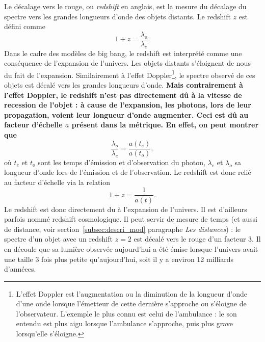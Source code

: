 \documentclass[11pt, twoside, a4paper, openright]{report}
\begin{document}
Le décalage vers le rouge, ou \emph{redshift} en anglais, est la mesure du décalage du spectre vers les grandes longueurs d'onde des objets distants. Le redshift $z$ est défini comme 
\begin{equation}
  \label{eq:redshift}
  1 + z = \frac{\lambda_o}{\lambda_e} .
\end{equation}
Dans le cadre des modèles de big bang, le redshift est interprété comme une conséquence de l'expansion de l'univers.
Les objets distants s'éloignent de nous du fait de l'expansion. Similairement à l'effet Doppler\footnote{L'effet Doppler est l'augmentation ou la diminution de la longueur d'onde d'une onde lorsque l'émetteur de cette dernière s'approche ou s'éloigne de l'observateur. L'exemple le plus connu est celui de l'ambulance : le son entendu est plus aigu lorsque l'ambulance s'approche, puis plus grave lorsqu'elle s'éloigne.}, le spectre observé de ces objets est décalé vers les grandes longueurs d'onde.
\textbf{
Mais contrairement à l'effet Doppler, le redshift n'est pas directement dû à la vitesse de recession de l'objet :
à cause de l'expansion, les photons, lors de leur propagation, voient leur longueur d'onde augmenter.
Ceci est dû au facteur d'échelle $a$ présent dans la métrique. En effet, on peut montrer que}
\begin{equation}
  \frac{\lambda_o}{\lambda_e} = \frac{a(t_e)}{a(t_o)} ,
\end{equation}
où $t_e$ et $t_o$ sont les temps d'émission et d'observation du photon, $\lambda_{e}$  et $\lambda_{o}$ sa longueur d'onde lors de l'émission et de l'observation. Le redshift est donc relié au facteur d'échelle via la relation
\begin{equation}
  \label{eq:redshift2}
  1 + z = \frac{1}{a(t)}.
\end{equation} 
Le redshift est donc directement du à l'expansion de l'univers. Il est d'ailleurs parfois nommé redshift cosmologique. Il peut servir de mesure de temps (et aussi de distance, voir section~\ref{subsec:descri_mod} paragraphe \emph{Les distances}) : le spectre d'un objet avec un redshift $z=2$ est décalé vers le rouge d'un facteur 3. Il en découle que sa lumière observée aujourd'hui a été émise lorsque l'univers avait une taille 3 fois plus petite qu'aujourd'hui, soit il y a environ 12 milliards d'annéees.
\end{document}

